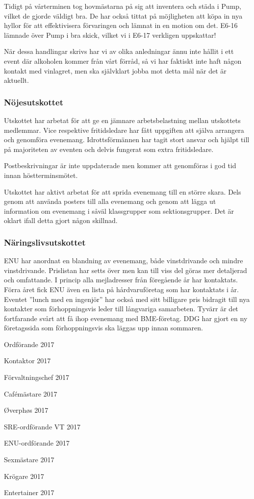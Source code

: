 \documentclass[../_main/handlingar.tex]{subfiles}
\begin{document}
Tidigt på vårterminen tog hovmästarna på sig att inventera och städa i Pump, vilket de gjorde väldigt bra. De har också tittat på möjligheten att köpa in nya hyllor för att effektivisera förvaringen och lämnat in en motion om det. E6-16 lämnade över Pump i bra skick, vilket vi i E6-17 verkligen uppskattar!

När dessa handlingar skrivs har vi av olika anledningar ännu inte hållit i ett event där alkoholen kommer från vårt förråd, så vi har faktiskt inte haft någon kontakt med vinlagret, men ska självklart jobba mot detta mål när det är aktuellt.

\subsubsection*{Nöjesutskottet}
Utskottet har arbetat för att ge en jämnare arbetsbelastning mellan utskottets medlemmar. Vice respektive fritidsledare har fått uppgiften att själva arrangera och genomföra evenemang. Idrottsförmännen har tagit stort ansvar och hjälpt till på majoriteten av eventen och delvis fungerat som extra fritidsledare.

Postbeskrivningar är inte uppdaterade men kommer att genomföras i god tid innan höstterminsmötet.

Utskottet har aktivt arbetat för att sprida evenemang till en större skara. Dels genom att använda posters till alla evenemang och genom att lägga ut information om evenemang i såväl klassgrupper som sektionsgrupper. Det är oklart ifall detta gjort någon skillnad.


\subsubsection*{Näringslivsutskottet}
ENU har anordnat en blandning av evenemang, både vinstdrivande och mindre vinstdrivande.  Prislistan har setts över men kan till viss del göras mer detaljerad och omfattande. I princip alla mejladresser från föregående år har kontaktats. Förra året fick ENU även en lista på hårdvaruföretag som har kontaktats i år. Eventet ”lunch med en ingenjör” har också med sitt billigare pris bidragit till nya kontakter som förhoppningsvis leder till långvariga samarbeten. Tyvärr är det fortfarande svårt att få ihop evenemang med BME-företag. DDG har gjort en ny företagssida som förhoppningsvis ska läggas upp innan sommaren.

\newpage
\begin{signatures}{10}
    \mvh
    \signature{Erik Månsson}{Ordförande 2017}
    \signature{Johan Karlberg}{Kontaktor 2017}
    \signature{Sophia Grimmeiss Grahm}{Förvaltningschef 2017}
    \signature{Daniel Bakic}{Cafémästare 2017}
    \signature{Niklas Gustafson}{Øverphøs 2017}
    \signature{Pontus Landgren}{SRE-ordförande VT 2017}
    \signature{Josefine Sandström}{ENU-ordförande 2017}
    \signature{Linnea Sjödahl}{Sexmästare 2017}
    \signature{Markus Rahne}{Krögare 2017}
    \signature{Albin Nyström Eklund}{Entertainer 2017}
\end{signatures}
\end{document}
